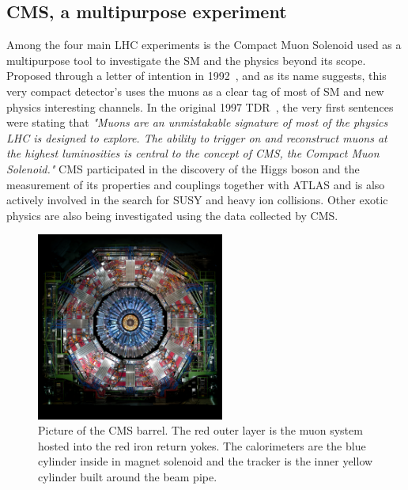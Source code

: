 	\subsection{CMS, a multipurpose experiment}
	\label{chapt2:ssec:CMS}
	
	Among the four main LHC experiments is the Compact Muon Solenoid used as a multipurpose tool to investigate the SM and the physics beyond its scope. Proposed through a letter of intention in 1992~\cite{CMSLOI}, and as its name suggests, this very compact detector's uses the muons as a clear tag of most of SM and new physics interesting channels. In the original 1997 \acf{TDR}~\cite{MUONTDR}, the very first sentences were stating that \textit{"Muons are an unmistakable signature of most of the physics LHC is designed to explore. The ability to trigger on and reconstruct muons at the highest luminosities is central to the concept of CMS, the Compact Muon Solenoid."} CMS participated in the discovery of the Higgs boson and the measurement of its properties and couplings together with ATLAS and is also actively involved in the search for SUSY and heavy ion collisions. Other exotic physics are also being investigated using the data collected by CMS.
	
	\begin{figure}[H]
		\centering
		\includegraphics[width=0.55\textwidth]{fig/chapt2/CMS.jpg}
		\caption{\label{fig:CMS} Picture of the CMS barrel. The red outer layer is the muon system hosted into the red iron return yokes. The calorimeters are the blue cylinder inside in magnet solenoid and the tracker is the inner yellow cylinder built around the beam pipe.}
	\end{figure}
	
